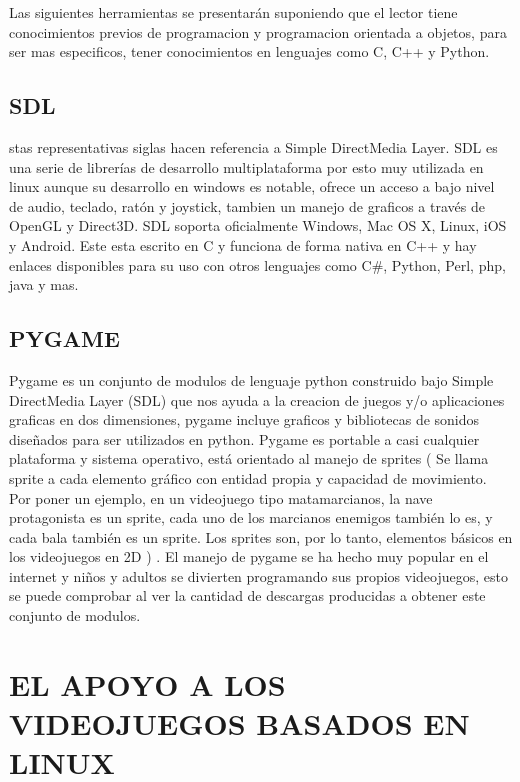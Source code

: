 Las siguientes herramientas se presentarán suponiendo que el
lector tiene conocimientos previos de programacion y
programacion orientada a objetos, para ser mas especificos,
tener conocimientos en lenguajes como C, C++ y Python.

\subsection*{SDL}

stas representativas siglas hacen referencia a Simple
DirectMedia Layer. SDL es una serie de librerías de desarrollo
multiplataforma por esto muy utilizada en linux aunque su
desarrollo en windows es notable, ofrece un acceso a bajo nivel
de audio, teclado, ratón y joystick, tambien un manejo de
graficos a través de OpenGL y Direct3D. SDL soporta
oficialmente Windows, Mac OS X, Linux, iOS y Android. Este
esta escrito en C y funciona de forma nativa en C++ y hay
enlaces disponibles para su uso con otros lenguajes como C#,
Python, Perl, php, java y mas.

\subsection*{PYGAME}

Pygame es un conjunto de modulos de lenguaje python
construido bajo Simple DirectMedia Layer (SDL) que nos ayuda
a la creacion de juegos y/o aplicaciones graficas en dos
dimensiones, pygame incluye graficos y bibliotecas de sonidos
diseñados para ser utilizados en python. Pygame es portable a
casi cualquier plataforma y sistema operativo, está orientado al
manejo de sprites ( Se llama sprite a cada elemento gráfico con
entidad propia y capacidad de movimiento. Por poner un
ejemplo, en un videojuego tipo matamarcianos, la nave
protagonista es un sprite, cada uno de los marcianos enemigos
también lo es, y cada bala también es un sprite. Los sprites son,
por lo tanto, elementos básicos en los videojuegos en 2D ) . El
manejo de pygame se ha hecho muy popular en el internet y
niños y adultos se divierten programando sus propios
videojuegos, esto se puede comprobar al ver la cantidad de
descargas producidas a obtener este conjunto de modulos.

\section*{EL APOYO A LOS VIDEOJUEGOS BASADOS EN LINUX}

